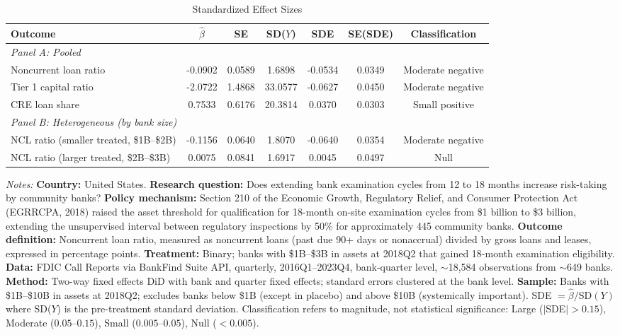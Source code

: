 \begin{table}[t]
\centering
\caption{Standardized Effect Sizes}
\label{tab:sde}
\footnotesize
\begin{adjustbox}{max width=\textwidth}
\begin{tabular}{lcccccc}
\toprule
Outcome & $\hat{\beta}$ & SE & SD($Y$) & SDE & SE(SDE) & Classification \\
\midrule
\textit{Panel A: Pooled} & & & & & & \\
Noncurrent loan ratio & -0.0902 & 0.0589 & 1.6898 & -0.0534 & 0.0349 & Moderate negative \\
Tier 1 capital ratio & -2.0722 & 1.4868 & 33.0577 & -0.0627 & 0.0450 & Moderate negative \\
CRE loan share & 0.7533 & 0.6176 & 20.3814 & 0.0370 & 0.0303 & Small positive \\
\addlinespace
\textit{Panel B: Heterogeneous (by bank size)} & & & & & & \\
NCL ratio (smaller treated, \$1B--\$2B) & -0.1156 & 0.0640 & 1.8070 & -0.0640 & 0.0354 & Moderate negative \\
NCL ratio (larger treated, \$2B--\$3B) & 0.0075 & 0.0841 & 1.6917 & 0.0045 & 0.0497 & Null \\
\bottomrule
\end{tabular}
\end{adjustbox}
\par\vspace{0.5em}
\begin{minipage}{\textwidth}
\scriptsize
\textit{Notes:} \textbf{Country:} United States. \textbf{Research question:} Does extending bank examination cycles from 12 to 18 months increase risk-taking by community banks? \textbf{Policy mechanism:} Section 210 of the Economic Growth, Regulatory Relief, and Consumer Protection Act (EGRRCPA, 2018) raised the asset threshold for qualification for 18-month on-site examination cycles from \$1 billion to \$3 billion, extending the unsupervised interval between regulatory inspections by 50\% for approximately 445 community banks. \textbf{Outcome definition:} Noncurrent loan ratio, measured as noncurrent loans (past due 90+ days or nonaccrual) divided by gross loans and leases, expressed in percentage points. \textbf{Treatment:} Binary; banks with \$1B--\$3B in assets at 2018Q2 that gained 18-month examination eligibility. \textbf{Data:} FDIC Call Reports via BankFind Suite API, quarterly, 2016Q1--2023Q4, bank-quarter level, ${\sim}$18,584 observations from ${\sim}$649 banks. \textbf{Method:} Two-way fixed effects DiD with bank and quarter fixed effects; standard errors clustered at the bank level. \textbf{Sample:} Banks with \$1B--\$10B in assets at 2018Q2; excludes banks below \$1B (except in placebo) and above \$10B (systemically important). SDE $= \hat{\beta} / \text{SD}(Y)$ where SD($Y$) is the pre-treatment standard deviation. Classification refers to magnitude, not statistical significance: Large ($|$SDE$| > 0.15$), Moderate ($0.05$--$0.15$), Small ($0.005$--$0.05$), Null ($< 0.005$).
\end{minipage}
\end{table}
